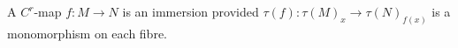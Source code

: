 A $C^r$-map $f: M \to N$ is an immersion provided $\tau(f): \tau(M)_x \to \tau(N)_{f(x)}$ is a monomorphism on each fibre.
